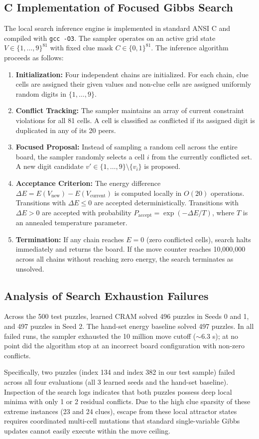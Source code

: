 \documentclass{article} %
\begin{document}
\subsection{C Implementation of Focused Gibbs Search}
The local search inference engine is implemented in standard ANSI C and compiled with \texttt{gcc -O3}. The sampler operates on an active grid state $V \in \{1, \dots, 9\}^{81}$ with fixed clue mask $C \in \{0, 1\}^{81}$. The inference algorithm proceeds as follows:
\begin{enumerate}
    \item \textbf{Initialization:} Four independent chains are initialized. For each chain, clue cells are assigned their given values and non-clue cells are assigned uniformly random digits in $\{1, \dots, 9\}$.
    \item \textbf{Conflict Tracking:} The sampler maintains an array of current constraint violations for all 81 cells. A cell is classified as conflicted if its assigned digit is duplicated in any of its 20 peers.
    \item \textbf{Focused Proposal:} Instead of sampling a random cell across the entire board, the sampler randomly selects a cell $i$ from the currently conflicted set. A new digit candidate $v' \in \{1, \dots, 9\} \setminus \{v_i\}$ is proposed.
    \item \textbf{Acceptance Criterion:} The energy difference $\Delta E = E(V_{\text{new}}) - E(V_{\text{current}})$ is computed locally in $O(20)$ operations. Transitions with $\Delta E \le 0$ are accepted deterministically. Transitions with $\Delta E > 0$ are accepted with probability $P_{\text{accept}} = \exp(-\Delta E / T)$, where $T$ is an annealed temperature parameter.
    \item \textbf{Termination:} If any chain reaches $E=0$ (zero conflicted cells), search halts immediately and returns the board. If the move counter reaches 10,000,000 across all chains without reaching zero energy, the search terminates as unsolved.
\end{enumerate}

\subsection{Analysis of Search Exhaustion Failures}
Across the 500 test puzzles, learned CRAM solved 496 puzzles in Seeds 0 and 1, and 497 puzzles in Seed 2. The hand-set energy baseline solved 497 puzzles. In all failed runs, the sampler exhausted the 10 million move cutoff ($\sim 6.3$ s); at no point did the algorithm stop at an incorrect board configuration with non-zero conflicts.

Specifically, two puzzles (index 134 and index 382 in our test sample) failed across all four evaluations (all 3 learned seeds and the hand-set baseline). Inspection of the search logs indicates that both puzzles possess deep local minima with only 1 or 2 residual conflicts. Due to the high clue sparsity of these extreme instances (23 and 24 clues), escape from these local attractor states requires coordinated multi-cell mutations that standard single-variable Gibbs updates cannot easily execute within the move ceiling.
\end{document}

